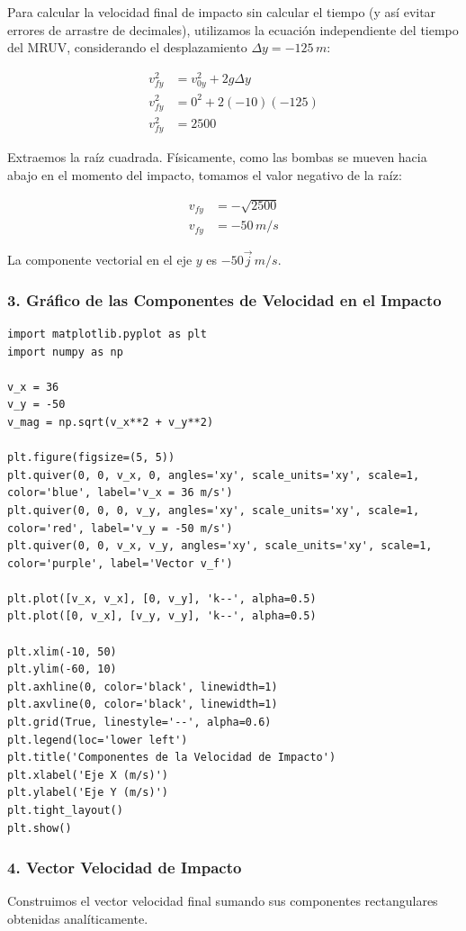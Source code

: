 \documentclass[12pt, a4paper]{article}
\begin{document}
Para calcular la velocidad final de impacto sin calcular el tiempo (y así evitar errores de arrastre de decimales), utilizamos la ecuación independiente del tiempo del MRUV, considerando el desplazamiento $\Delta y = -125 \, \si{m}$:

\begin{align*}
v_{fy}^2 &= v_{0y}^2 + 2 g \Delta y \\
v_{fy}^2 &= 0^2 + 2(-10)(-125) \\
v_{fy}^2 &= 2500
\end{align*}

Extraemos la raíz cuadrada. Físicamente, como las bombas se mueven hacia abajo en el momento del impacto, tomamos el valor negativo de la raíz:

\begin{align*}
v_{fy} &= -\sqrt{2500} \\
v_{fy} &= -50 \, \si{m/s}
\end{align*}

La componente vectorial en el eje $y$ es $-50\vec{j} \, \si{m/s}$. 
\subsubsection*{3. Gráfico de las Componentes de Velocidad en el Impacto}
\begin{verbatim}
import matplotlib.pyplot as plt
import numpy as np

v_x = 36
v_y = -50
v_mag = np.sqrt(v_x**2 + v_y**2)

plt.figure(figsize=(5, 5))
plt.quiver(0, 0, v_x, 0, angles='xy', scale_units='xy', scale=1, color='blue', label='v_x = 36 m/s')
plt.quiver(0, 0, 0, v_y, angles='xy', scale_units='xy', scale=1, color='red', label='v_y = -50 m/s')
plt.quiver(0, 0, v_x, v_y, angles='xy', scale_units='xy', scale=1, color='purple', label='Vector v_f')

plt.plot([v_x, v_x], [0, v_y], 'k--', alpha=0.5)
plt.plot([0, v_x], [v_y, v_y], 'k--', alpha=0.5)

plt.xlim(-10, 50)
plt.ylim(-60, 10)
plt.axhline(0, color='black', linewidth=1)
plt.axvline(0, color='black', linewidth=1)
plt.grid(True, linestyle='--', alpha=0.6)
plt.legend(loc='lower left')
plt.title('Componentes de la Velocidad de Impacto')
plt.xlabel('Eje X (m/s)')
plt.ylabel('Eje Y (m/s)')
plt.tight_layout()
plt.show()
\end{verbatim}

\subsubsection*{4. Vector Velocidad de Impacto}
Construimos el vector velocidad final sumando sus componentes rectangulares obtenidas analíticamente.
\end{document}
